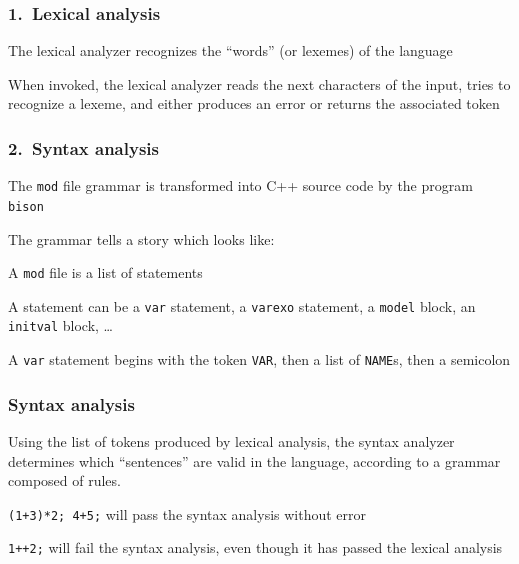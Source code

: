\documentclass[handout,usepdftitle=false,xcolor=dvipsnames,aspectratio=169]{beamer}
\begin{document}
\begin{frame}
\frametitle{1.\ Lexical analysis}
\begin{witemize}
\item The lexical analyzer recognizes the ``words'' (or \alert{lexemes}) of the language
\item When invoked, the lexical analyzer reads the next characters of the input, tries to recognize a lexeme, and either produces an error or returns the associated token
\end{witemize}
\end{frame}

\begin{frame}
\frametitle{2.\ Syntax analysis}
\begin{witemize}
\item The \texttt{mod} file grammar is transformed into C++ source code by the program \texttt{bison}
\item The grammar tells a story which looks like:
  \begin{witemize}
  \item A \texttt{mod} file is a list of statements
  \item A statement can be a \texttt{var} statement, a \texttt{varexo} statement, a \texttt{model} block, an \texttt{initval} block, \ldots
  \item A \texttt{var} statement begins with the token \texttt{VAR}, then a list of \texttt{NAME}s, then a semicolon
  \end{witemize}
\end{witemize}
\end{frame}

\begin{frame}[fragile]
\frametitle{Syntax analysis}
\begin{witemize}
\item Using the list of tokens produced by lexical analysis, the syntax analyzer determines which ``sentences'' are valid in the language, according to a \alert{grammar} composed of \alert{rules}.
\item \texttt{(1+3)*2; 4+5;} will pass the syntax analysis without error
\item \texttt{1++2;} will fail the syntax analysis, even though it has passed the lexical analysis
\end{witemize}
\end{frame}
\end{document}
